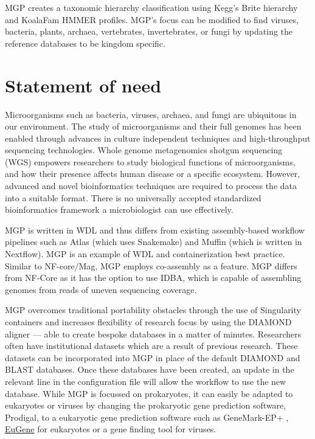 MGP creates a taxonomic hierarchy classification using Kegg's Brite
hierarchy and KoalaFam HMMER profiles. MGP's focus can be modified to
find viruses, bacteria, plants, archaea, vertebrates, invertebrates, or
fungi by updating the reference databases to be kingdom specific.

\hypertarget{statement-of-need}{%
\section{Statement of need}\label{statement-of-need}}

Microorganisms such as bacteria, viruses, archaea, and fungi are
ubiquitous in our environment. The study of microorganisms and their
full genomes has been enabled through advances in culture independent
techniques and high-throughput sequencing technologies. Whole genome
metagenomics shotgun sequencing (WGS) empowers researchers to study
biological functions of microorganisms, and how their presence affects
human disease or a specific ecosystem. However, advanced and novel
bioinformatics techniques are required to process the data into a
suitable format. There is no universally accepted standardized
bioinformatics framework a microbiologist can use effectively.

MGP is written in WDL and thus differs from existing assembly-based
workflow pipelines such as Atlas (which uses Snakemake) and Muffin
(which is written in Nextflow). MGP is an example of WDL and
containerization best practice. Similar to NF-core/Mag, MGP employs
co-assembly as a feature. MGP differs from NF-Core as it has the option
to use IDBA, which is capable of assembling genomes from reads of uneven
sequencing coverage.

MGP overcomes traditional portability obstacles through the use of
Singularity containers and increases flexibility of research focus by
using the DIAMOND aligner --- able to create bespoke databases in a
matter of minutes. Researchers often have institutional datasets which
are a result of previous research. These datasets can be incorporated
into MGP in place of the default DIAMOND and BLAST databases. Once these
databases have been created, an update in the relevant line in the
configuration file will allow the workflow to use the new database.
While MGP is focussed on prokaryotes, it can easily be adapted to
eukaryotes or viruses by changing the prokaryotic gene prediction
software, Prodigal, to a eukaryotic gene prediction software such as
GeneMark-EP+ \autocite{10.1093/nargab/lqaa026},
\href{http://eugene.toulouse.inra.fr/}{EuGene} \autocite{Sallet2019} for
eukaryotes or a gene finding tool for viruses.

